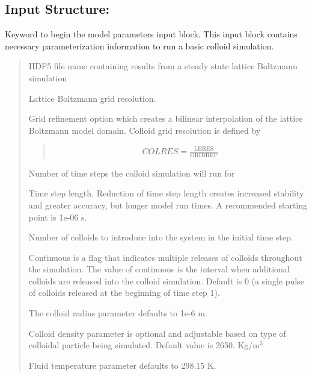 \documentclass[letterpaper,10pt,english]{sphinxmanual}
\begin{document}
\subsection{Input Structure:}
\label{\detokenize{index:id2}}
 Keyword to begin the model
parameters input block. This input block contains necessary
parameterization information to run a basic colloid simulation.
\begin{quote}

 HDF5 file name containing results from a
steady state lattice Boltzmann simulation

 Lattice Boltzmann grid resolution.

 Grid refinement option which creates a bilinear
interpolation of the lattice Boltzmann model domain. Colloid grid
resolution is defined by
\begin{quote}
\begin{equation*}
\begin{split}COLRES = \frac{\text{LBRES}}{\text{GRIDREF}}\end{split}
\end{equation*}\end{quote}

 Number of time steps the colloid simulation
will run for

 Time step length. Reduction of time step
length creates increased stability and greater accuracy, but longer
model run times. A recommended starting point is 1e-06 s.

 Number of colloids to introduce into the system
in the initial time step.

 Continuous is a flag that indicates
multiple releases of colloids throughout the simulation. The value
of continuous is the interval when additional colloids are released
into the colloid simulation. Default is 0 (a single pulse of
colloids released at the beginning of time step 1).

 The colloid radius parameter defaults to 1e-6 m.

 Colloid density parameter is optional
and adjustable based on type of colloidal particle being simulated.
Default value is 2650. Kg/m$^{\text{3}}$

 Fluid temperature parameter defaults to
298.15 K.
\end{quote}
\end{document}
